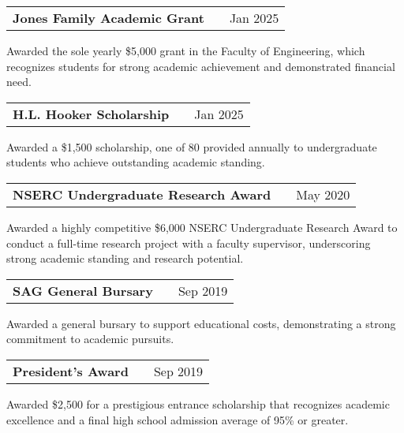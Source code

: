\documentclass[a4paper,10pt]{article}
\begin{document}
\vspace{6pt}

\begin{tabularx}{\linewidth}{@{}l X r@{}}
\textbf{Jones Family Academic Grant} & \hfill &     Jan 2025
 \end{tabularx}
Awarded the sole yearly \$5,000 grant in the Faculty of Engineering, which recognizes students for strong academic achievement and demonstrated financial need.


\vspace{6pt}

\begin{tabularx}{\linewidth}{@{}l X r@{}}
\textbf{H.L. Hooker Scholarship} & \hfill &     Jan 2025
 \end{tabularx}
Awarded a \$1,500 scholarship, one of 80 provided annually to undergraduate students who achieve outstanding academic standing.
\vspace{6pt}

\begin{tabularx}{\linewidth}{@{}l X r@{}}
\textbf{NSERC Undergraduate Research Award} & \hfill &     May 2020
 \end{tabularx}
Awarded a highly competitive \$6,000 NSERC Undergraduate Research Award to conduct a full-time research project with a faculty supervisor, underscoring strong academic standing and research potential.
\vspace{6pt}

\begin{tabularx}{\linewidth}{@{}l X r@{}}
\textbf{SAG General Bursary} & \hfill &     Sep 2019
 \end{tabularx}
Awarded a general bursary to support educational costs, demonstrating a strong commitment to academic pursuits.
\vspace{6pt}

\begin{tabularx}{\linewidth}{@{}l X r@{}}
\textbf{President’s Award} & \hfill &     Sep 2019
 \end{tabularx}
Awarded \$2,500 for a prestigious entrance scholarship that recognizes academic excellence and a final high school admission average of 95\% or greater.
\end{document}
